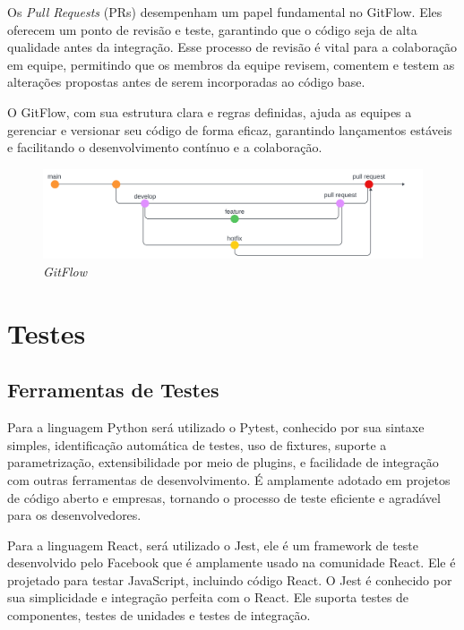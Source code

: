 Os \textit{Pull Requests} (PRs) desempenham um papel fundamental no GitFlow. Eles oferecem um ponto de revisão e teste, garantindo que o código seja de alta qualidade antes da integração. Esse processo de revisão é vital para a colaboração em equipe, permitindo que os membros da equipe revisem, comentem e testem as alterações propostas antes de serem incorporadas ao código base.

O GitFlow, com sua estrutura clara e regras definidas, ajuda as equipes a gerenciar e versionar seu código de forma eficaz, garantindo lançamentos estáveis e facilitando o desenvolvimento contínuo e a colaboração.

\begin{figure}[ht]
	\centering
	\includegraphics[width=1\linewidth]{Textuais/gitflow.png}
	\caption{\textit{GitFlow}}
	\label{fig:enter-label}
\end{figure}

\section{Testes}
\subsection{Ferramentas de Testes}

\par Para a linguagem Python será utilizado o Pytest, conhecido por sua sintaxe simples, identificação automática de testes, uso de fixtures, suporte a parametrização, extensibilidade por meio de plugins, e facilidade de integração com outras ferramentas de desenvolvimento. É amplamente adotado em projetos de código aberto e empresas, tornando o processo de teste eficiente e agradável para os desenvolvedores.

\par Para a linguagem React, será utilizado o Jest, ele é um framework de teste desenvolvido pelo Facebook que é amplamente usado na comunidade React. Ele é projetado para testar JavaScript, incluindo código React. O Jest é conhecido por sua simplicidade e integração perfeita com o React. Ele suporta testes de componentes, testes de unidades e testes de integração.

